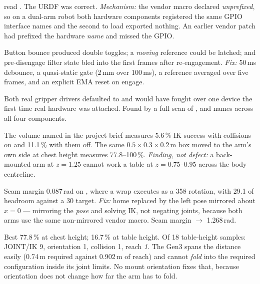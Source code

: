{ read
\code{[unavailable] [unclaimed]}. The URDF was correct. \textit{Mechanism:} the
vendor macro declared 
\emph{unprefixed}, so on a dual-arm robot both hardware components registered
the same GPIO interface names and the second to load exported nothing. An
earlier vendor patch had prefixed the hardware \emph{name} and missed the GPIO.}

{Button bounce produced double toggles; a \emph{moving} reference could be
latched; and pre-disengage filter state bled into the first frames after
re-engagement. \textit{Fix:} 50\,ms debounce, a quasi-static gate (2\,mm over
100\,ms), a reference averaged over five frames, and an explicit EMA reset on
engage.}

{Both real gripper drivers defaulted to  and would
have fought over one device the first time real hardware was attached. Found by
a full scan of ,  and  names across
all four  components.}

{The volume named in the project brief measures 5.6\,\% IK success with
collisions on and 11.1\,\% with them off. The same $0.5\times0.3\times0.2$\,m
box moved to the arm's own side at chest height measures 77.8--100\,\%.
\textit{Finding, not defect:} a back-mounted arm at $z=1.25$ cannot work a
table at $z=0.75$--$0.95$ across the body centreline.}

{Seam margin 0.087\,rad on , where a wrap executes as a
358\dg{} rotation, with 29.1\dg{} of headroom against a 30\dg{} target.
\textit{Fix:} home replaced by the left pose mirrored about $x=0$ --- mirroring
the \emph{pose} and solving IK, not negating joints, because both arms use the
same non-mirrored vendor macro. Seam margin $\rightarrow$ 1.268\,rad.}

{Best 77.8\,\% at chest height; 16.7\,\% at table height. Of 18 table-height
samples: JOINT/IK 9, orientation 1, collision 1, reach \emph{1}. The Gen3
spans the distance easily (0.74\,m required against 0.902\,m of reach) and
cannot \emph{fold} into the required configuration inside its joint limits.
No mount orientation fixes that, because orientation does not change how far
the arm has to fold.}

